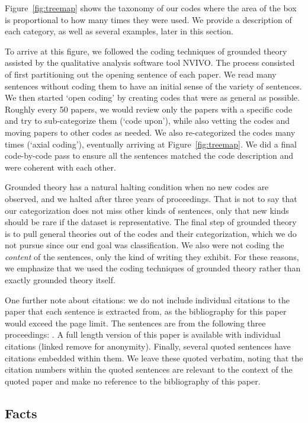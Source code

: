 \documentclass[sigconf,anonymous]{acmart}
\begin{document}
	Figure~\ref{fig:treemap} shows the taxonomy of our codes where the area of the box is proportional to how many times they were used. We provide a description of each category, as well as several examples, later in this section.
	
	To arrive at this figure, we followed the coding techniques of grounded theory assisted by the qualitative analysis software tool NVIVO. The process consisted of first partitioning out the opening sentence of each paper. We read many sentences without coding them to have an initial sense of the variety of sentences. We then started `open coding' by creating codes that were as general as possible. Roughly every 50 papers, we would review only the papers with a specific code and try to sub-categorize them (`code upon'), while also vetting the codes and moving papers to other codes as needed. We also re-categorized the codes many times (`axial coding'), eventually arriving at Figure~\ref{fig:treemap}. We did a final code-by-code pass to ensure all the sentences matched the code description and were coherent with each other. 
	
	Grounded theory has a natural halting condition when no new codes are observed, and we halted after three years of proceedings. That is not to say that our categorization does not miss other kinds of sentences, only that new kinds should be rare if the dataset is representative. The final step of grounded theory is to pull general theories out of the codes and their categorization, which we do not pursue since our end goal was classification. We also were not coding the \textit{content} of the sentences, only the kind of writing they exhibit. For these reasons, we emphasize that we used the coding techniques of grounded theory rather than exactly grounded theory itself. 
		
	One further note about citations: we do not include individual citations to the paper that each sentence is extracted from, as the bibliography for this paper would exceed the page limit. The sentences are from the following three proceedings: \cite{usenix14,usenix15,usenix16}. A full length version of this paper is available with individual citations (linked remove for anonymity). Finally, several quoted sentences have citations embedded within them. We leave these quoted verbatim, noting that the citation numbers within the quoted sentences are relevant to the context of the quoted paper and make no reference to the bibliography of this paper. 
	
	
	\subsection{Facts}
\end{document}
